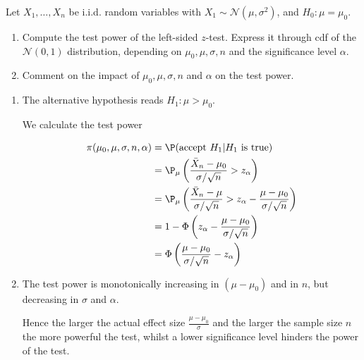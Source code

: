 
\begin{exercise}

Let $X_1,\dots,X_n$ be i.i.d. random variables with $X_1 \sim \mathcal{N}(\mu,\sigma^2)$,
and $H_0: \mu = \mu_0$.

\begin{enumerate}[label = (\alph*)]
    \item Compute the test power of the left-sided $z$-test.
    Express it through cdf of the $\mathcal{N}(0,1)$ distribution, depending
    on $\mu_0,\mu,\sigma,n$ and the significance level $\alpha$.
    \item Comment on the impact of $\mu_0, \mu, \sigma, n$ and $\alpha$ on the test power.
\end{enumerate}

\end{exercise}


\begin{solution}

\phantom{}

\begin{enumerate}[label = (\alph*)]
    \item The alternative hypothesis reads $H_1: \mu > \mu_0$.
    
    We calculate the test power

    \begin{align*}
        \pi(\mu_0, \mu, \sigma, n, \alpha) 
        &= \P(\text{accept } H_1 | H_1 \text{ is true}) \\
        &= \P_{\mu}\left(\frac{\bar{X}_n - \mu_0}{\sigma/\sqrt{n}} > z_\alpha\right) \\
        &= \P_{\mu}\left(\frac{\bar{X}_n - \mu}{\sigma/\sqrt{n}} > z_\alpha - \frac{\mu - \mu_0}{\sigma/ \sqrt{n}}\right) \\
        &= 1 - \Phi\left(z_\alpha - \frac{\mu - \mu_0}{\sigma/ \sqrt{n}}\right) \\
        &= \Phi\left(\frac{\mu - \mu_0}{\sigma/ \sqrt{n}} - z_\alpha\right)
    \end{align*}

    \item The test power is monotonically increasing in $(\mu - \mu_0)$ and in $n$,
    but decreasing in $\sigma$ and $\alpha$.

    Hence the larger the actual effect size $\frac{\mu - \mu_0}{\sigma}$ 
    and the larger the sample size $n$ the more powerful the test,
    whilst a lower significance level hinders the power of the test.
\end{enumerate}

\end{solution}

